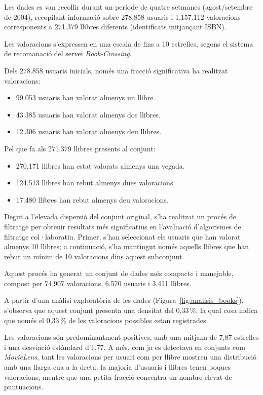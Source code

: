 \documentclass[a4paper,12pt]{report}
\begin{document}
Les dades es van recollir durant un període de quatre setmanes (agost/setembre de 2004), recopilant informació sobre 278.858 usuaris i 1.157.112 valoracions corresponents a 271.379 llibres diferents (identificats mitjançant ISBN).

Les valoracions s’expressen en una escala de fins a 10 estrelles, segons el sistema de recomanació del servei \emph{Book-Crossing}.

Dels 278.858 usuaris inicials, només una fracció significativa ha realitzat valoracions:

\begin{itemize}
    \item 99.053 usuaris han valorat almenys un llibre.
    \item 43.385 usuaris han valorat almenys dos llibres.
    \item 12.306 usuaris han valorat almenys deu llibres.
\end{itemize}

Pel que fa als 271.379 llibres presents al conjunt:

\begin{itemize}
    \item 270.171 llibres han estat valorats almenys una vegada.
    \item 124.513 llibres han rebut almenys dues valoracions.
    \item 17.480 llibres han rebut almenys deu valoracions.
\end{itemize}

Degut a l’elevada dispersió del conjunt original, s’ha realitzat un procés de filtratge per obtenir resultats més significatius en l’avaluació d’algorismes de filtratge col·laboratiu. Primer, s’han seleccionat els usuaris que han valorat almenys 10 llibres; a continuació, s’ha mantingut només aquells llibres que han rebut un mínim de 10 valoracions dins aquest subconjunt.

Aquest procés ha generat un conjunt de dades més compacte i manejable, compost per 74.907 valoracions, 6.570 usuaris i 3.411 llibres.

A partir d’una anàlisi exploratòria de les dades (Figura~\ref{fig:analisis_books}), s’observa que aquest conjunt presenta una densitat del 0,33\,\%, la qual cosa indica que només el 0,33\,\% de les valoracions possibles estan registrades.

Les valoracions són predominantment positives, amb una mitjana de 7,87 estrelles i una desviació estàndard d’1,77. A més, com ja es detectava en conjunts com \emph{MovieLens}, tant les valoracions per usuari com per llibre mostren una distribució amb una llarga cua a la dreta: la majoria d’usuaris i llibres tenen poques valoracions, mentre que una petita fracció concentra un nombre elevat de puntuacions.
\end{document}
